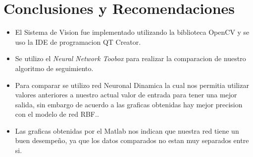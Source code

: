 \documentclass[conference]{IEEEtran}
\begin{document}
%
\section{Conclusiones y Recomendaciones}
\begin{itemize}
\item El Sistema de Vision fue implementado utilizando la biblioteca OpenCV y se uso la IDE de programacion  QT Creator.
\item Se utilizo el \textit{Neural Network Toobox} para realizar la comparacion de nuestro algoritmo de seguimiento.
\item Para comparar se utilizo red Neuronal Dinamica la cual nos permitia utilizar valores anteriores a nuestro actual valor de entrada para tener una mejor salida, sin embargo de acuerdo a las graficas obtenidas hay mejor precision con el modelo de red RBF..
\item Las graficas obtenidas por el Matlab nos indican que nuestra red tiene un buen desempeño, ya que los datos comparados no estan muy separados entre si.
\end{itemize}

\end{document}

